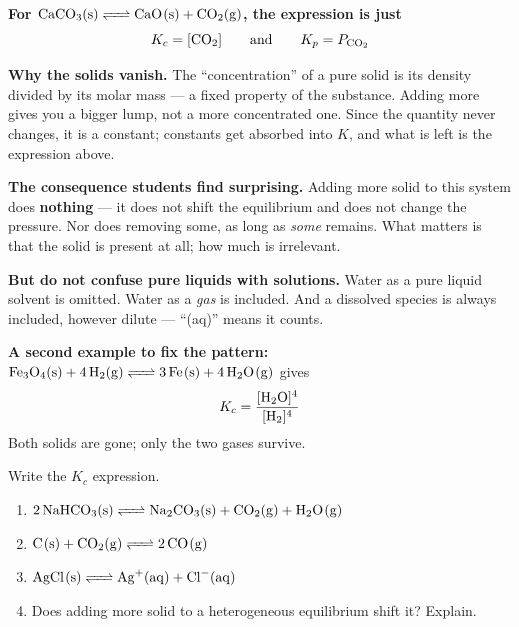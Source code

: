 \documentclass{apchem-worksheet}
\begin{document}
\begin{workedexample}
\textbf{For $\ce{CaCO3(s) <=> CaO(s) + CO2(g)}$, the expression is
just}
\[ K_{c} = [\ce{CO2}]
   \qquad\text{and}\qquad
   K_{p} = P_{\ce{CO2}} \]

\textbf{Why the solids vanish.} The ``concentration'' of a pure solid
is its density divided by its molar mass --- a fixed property of the
substance. Adding more  gives you a bigger lump, not a more
concentrated one. Since the quantity never changes, it is a constant;
constants get absorbed into $K$, and what is left is the expression
above.

\textbf{The consequence students find surprising.} Adding more solid
 to this system does \textbf{nothing} --- it does not shift
the equilibrium and does not change the  pressure. Nor does
removing some, as long as \emph{some} remains. What matters is that the
solid is present at all; how much is irrelevant.

\textbf{But do not confuse pure liquids with solutions.} Water as a pure
liquid solvent is omitted. Water as a \emph{gas} is included. And a
dissolved species is always included, however dilute --- ``(aq)'' means
it counts.

\textbf{A second example to fix the pattern:}
$\ce{Fe3O4(s) + 4H2(g) <=> 3Fe(s) + 4H2O(g)}$ gives
\[ K_{c} = \frac{[\ce{H2O}]^{4}}{[\ce{H2}]^{4}} \]
Both solids are gone; only the two gases survive.
\end{workedexample}

\begin{yourturn}
Write the $K_{c}$ expression.
\begin{enumerate}[leftmargin=*,itemsep=0.5em]
  \item $\ce{2NaHCO3(s) <=> Na2CO3(s) + CO2(g) + H2O(g)}$
        \workspace[1.6cm]
  \item $\ce{C(s) + CO2(g) <=> 2CO(g)}$ \workspace[1.6cm]
  \item $\ce{AgCl(s) <=> Ag+(aq) + Cl-(aq)}$ \workspace[1.6cm]
  \item Does adding more solid to a heterogeneous equilibrium shift it?
        Explain. \workspace[1.8cm]
\end{enumerate}
\end{yourturn}
\end{document}
